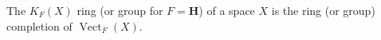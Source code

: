 The $K_F(X)$ ring (or group for $F = \mathbf{H}$) of a space $X$ is the ring (or group) completion of $\operatorname{Vect}_F(X)$.

